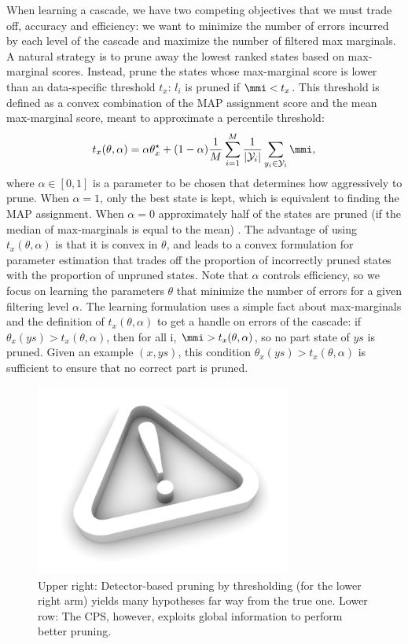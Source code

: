 When learning a cascade, we have two competing objectives that we must trade off,
accuracy and efficiency: we want to minimize the number of errors incurred by each
level of the cascade  and maximize the number of filtered max marginals.  A natural strategy is to prune away the lowest ranked states based on max-marginal scores. Instead, \cite{cascades} prune the states whose max-marginal score is lower than an data-specific threshold $t_x$: $l_i$ is pruned if $\mmi < t_x$.  This threshold is defined as a convex combination of the MAP assignment score and the mean max-marginal score, meant to approximate a percentile threshold: $$t_x(\theta,\alpha) = \alpha \theta^\star_x + (1-\alpha)\frac{1}{M}\sum_{i=1}^M\frac{1}{|\mathcal{Y}_i|}\sum_{y_i \in \mathcal{Y}_i} \mmi,$$ where $\alpha\in[0,1]$ is a parameter to be chosen that determines how aggressively to prune. When $\alpha = 1$, only the best state is kept, which is equivalent to finding the MAP assignment.  When $\alpha = 0$ approximately half of the states are pruned (if the median of max-marginals is equal to the mean) .  The advantage of using  $t_x(\theta,\alpha)$ is that it is convex in $\theta$, and leads to a convex formulation for parameter estimation that trades off the proportion of incorrectly pruned states with the proportion of unpruned states.
Note that  $\alpha$ controls efficiency, so we focus on learning the parameters $\theta$ that 
minimize the number of errors for a given filtering level $\alpha$.   The learning formulation uses a simple fact about max-marginals and the definition of $t_x(\theta,\alpha)$
to get a handle on errors of the cascade:
if $\theta_x(ys) > t_x(\theta,\alpha)$, then for all i, $\mmi >  t_x(\theta,\alpha)$, so no part state of $ys$ is pruned.   Given an example $(x,ys)$,
this condition $\theta_x(ys) > t_x(\theta,\alpha)$ is sufficient to ensure that no correct part is pruned.
\begin{figure}[t]
\begin{center}
\includegraphics[width=0.75\textwidth]{figs/empty.jpg}
\caption{Upper right: Detector-based pruning by thresholding (for the lower 
right arm) yields many hypotheses far way from the true one. Lower row: The 
CPS, however, exploits global information to perform better pruning.}
\label{fig:cascade_pruning}
\end{center}
\end{figure}

